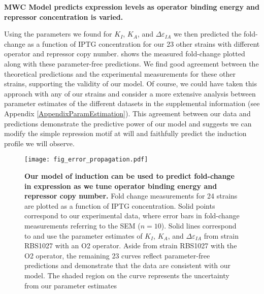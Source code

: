\noindent \textbf{MWC Model predicts expression levels as operator binding energy and repressor concentration is varied.}

Using the parameters we found for $K_I$, $K_A$, and $\Delta\varepsilon_{IA}$ we
then predicted the fold-change as a function of IPTG concentration for our 23
other strains with different operator and repressor copy number.
 shows the measured fold-change plotted along with these
parameter-free predictions. We find good agreement between the theoretical
predictions and the experimental measurements for these other strains,
supporting the validity of our model. Of course, we could have taken this
approach with any of our strains and consider a more extensive analysis between
parameter estimates of the different datasets in the supplemental information
(see Appendix \ref{AppendixParamEstimation}). This agreement between our data
and predictions demonstrate the predictive power of our model and suggests we
can modify the simple repression motif at will and faithfully predict the
induction profile we will observe. %


\begin{figure}[h]
	\centering
	\texttt{[image: fig\_error\_propagation.pdf]}
	\caption{{\bf Our model of induction can be used to predict fold-change in expression as we tune operator binding energy and repressor copy number. } \tiny{ } Fold
		change measurements for 24 strains are plotted as a function of IPTG concentration. Solid points
		correspond to our experimental data, where error bars in fold-change
		measurements referring to the SEM ($n=10$). Solid lines correspond to
		\eref[eq7] and use the parameter estimates of $K_I$, $K_A$, and $\Delta\varepsilon_{IA}$ from
		strain RBS1027 with an O2 operator. Aside from strain RBS1027 with the O2
		operator, the remaining 23 curves reflect parameter-free predictions and
		demonstrate that the data are consistent with our model. The shaded region on
		the curve represents the uncertainty from our parameter estimates}
		\label{fig_result2}
\end{figure}

